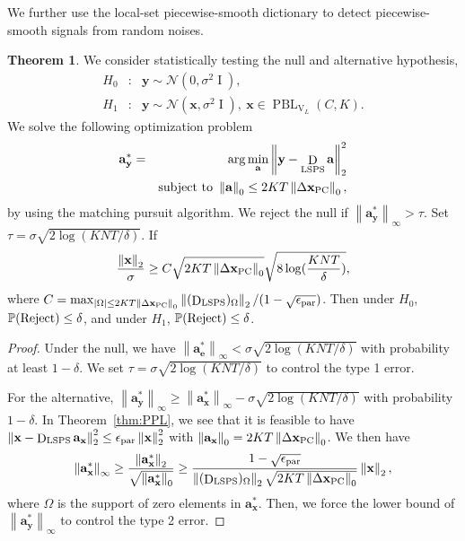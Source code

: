 \documentclass[journal,twocolumn,10pt]{IEEEtran}
\theoremstyle{definition}
\newtheorem{myThm}{Theorem}
\DeclareMathOperator{\Id}{I}
\def\a{\mathbf{a}}
\def\x{\mathbf{x}}
\def\y{\mathbf{y}}
\def\e{\mathbf{e}}
\def\N{\mathcal{N}}
\DeclareMathOperator{\PBL}{PBL}
\DeclareMathOperator{\D}{D}
\DeclareMathOperator{\Vm}{V}
\begin{document}
We further use the local-set piecewise-smooth dictionary to detect piecewise-smooth signals from random noises.
\begin{myThm}
\label{thm:PPL_Detect}
We consider statistically testing the null and alternative hypothesis,
\begin{eqnarray*}
H_0 &:& \y \sim \N(0, \sigma^2 \Id), 
\\
H_1 &:&  \y \sim \N(\x, \sigma^2 \Id),~\x \in \PBL_{\Vm_L}(C,K).
\end{eqnarray*}
We solve the following optimization problem
\begin{eqnarray*}
   \a_{\y}^* &  = &   \arg \min_{\a}  \left\| \y - \D_{\rm LSPS} \a \right\|_2^2   
   \\
   && {\rm subject~to~}  \left\| \a \right\|_0 \leq 2KT  \left\| \Delta \x_{\rm PC} \right\|_0,
\end{eqnarray*}
by using the matching pursuit algorithm. We reject the null if $\left\| \a_{\y}^* \right\|_{\infty} > \tau$. Set $\tau = \sigma \sqrt{2 \log(KNT/\delta)}$. If
$$
\frac{\left\| \x \right\|_2}{\sigma} \geq C \sqrt{2KT \left\| \Delta \x_{\rm PC} \right\|_0 }  \sqrt{8 \log(\frac{KNT}{\delta})},
$$
where $C = \max_{ |\Omega| \leq 2KT \left\| \Delta \x_{\rm PC} \right\|_0  } \left\| (\D_{\rm LSPS})_{\Omega} \right\|_2 /(1- \sqrt{\epsilon_{\rm par}}) $. Then under $H_0$, $\mathbb{P}({\rm Reject}) \leq \delta$, and under $H_1$, $\mathbb{P} ({\rm Reject}) \leq \delta$.
\end{myThm}

\begin{proof}
Under the null, we have $\left\| \a_{\e}^* \right\|_{\infty} < \sigma \sqrt{2 \log( KNT /\delta)}$ with probability at least $1-\delta$. We set $\tau = \sigma \sqrt{2 \log(KNT/\delta)}$ to control the type 1 error.

For the alternative, $\left\| \a_{\y}^* \right\|_{\infty} \geq \left\| \a_{\x}^* \right\|_{\infty} - \sigma \sqrt{2 \log(KNT/\delta)}$ with probability $1-\delta$. In Theorem~\ref{thm:PPL}, we see that it is feasible to have $\left\| \x - \D_{\rm LSPS} \a_\x \right\|_2^2 \leq \epsilon_{\rm par} \left\| \x \right\|_2^2$ with $\left\| \a_\x \right\|_0 = 2KT  \left\| \Delta \x_{\rm PC} \right\|_0$. We then have
\begin{eqnarray*}
 \left\| \a_{\x}^* \right\|_{\infty} \geq  \frac{ \left\| \a_{\x}^* \right\|_{2}  }{ \sqrt{ \left\| \a_{\x}^* \right\|_0 } } 
\geq 
  \frac{ 1 - \sqrt{ \epsilon_{\rm par}}}{ \left\| (\D_{\rm LSPS})_{\Omega} \right\|_2 \sqrt{ 2KT  \left\| \Delta \x_{\rm PC} \right\|_0  } }   \left\| \x \right\|_2,
\end{eqnarray*}
where $\Omega$ is the support of zero elements in $\a_{\x}^*$. Then, we force the lower bound of $\left\| \a_{\y}^* \right\|_{\infty} $ to control the type 2 error.
\end{proof}
\end{document}
